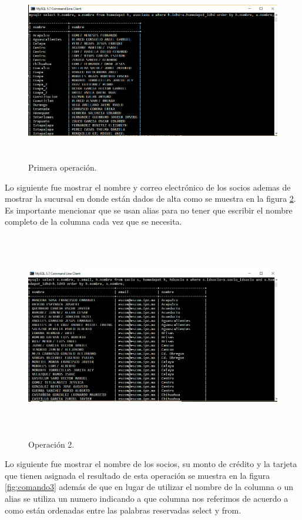 \documentclass[12pt, titlepage]{article}
\begin{document}
 \begin{figure}[H]
	\begin{center}
		\includegraphics[width=16cm, height=8cm]{img/comando1.png}
		\caption{Primera operación.}
		\label{fig:comando1}
	\end{center}
\end{figure}
Lo siguiente fue mostrar el nombre y correo electrónico de los socios ademas de mostrar la sucursal en donde están dados de alta como se muestra en la figura \ref{fig:comando2}. Es importante mencionar que se usan alias para no tener que escribir el nombre completo de la columna cada vez que se necesita.
 \begin{figure}[H]
	\begin{center}
		\includegraphics[width=16cm, height=9cm]{img/comando2.png}
		\caption{Operación 2.}
		\label{fig:comando2}
	\end{center}
\end{figure}
Lo siguiente fue mostrar el nombre de los socios, su monto de crédito y la tarjeta que tienen asignada el resultado de esta operación se muestra en la figura \ref{fig:comando3} además de que en lugar de utilizar el nombre de la columna o un alias se utiliza un numero indicando a que columna nos referimos de acuerdo a como están ordenadas entre las palabras reservadas select y from.
\end{document}
